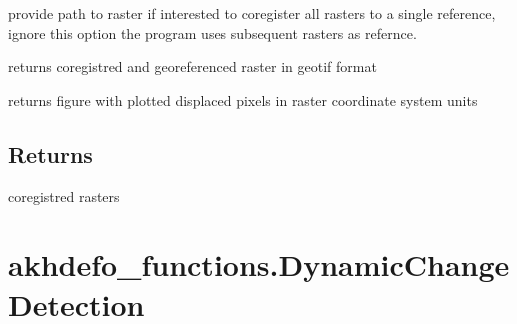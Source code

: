 \documentclass[letterpaper,10pt]{sphinxmanual}
\begin{document}
\begin{fulllineitems}
\begin{description}
\sphinxAtStartPar
provide path to raster if interested to coregister all rasters to a single reference, ignore this option the program uses subsequent rasters as refernce.

\sphinxAtStartPar
returns coregistred and georeferenced raster in geotif format

\sphinxAtStartPar
returns figure with plotted displaced pixels in raster coordinate system units

\end{description}


\section{Returns}
\label{\detokenize{generated/akhdefo_functions.Coregistration:returns}}
\sphinxAtStartPar
coregistred rasters

\end{fulllineitems}


\sphinxstepscope


\chapter{akhdefo\_functions.DynamicChangeDetection}
\label{\detokenize{generated/akhdefo_functions.DynamicChangeDetection:akhdefo-functions-dynamicchangedetection}}\label{\detokenize{generated/akhdefo_functions.DynamicChangeDetection::doc}}
\end{document}
